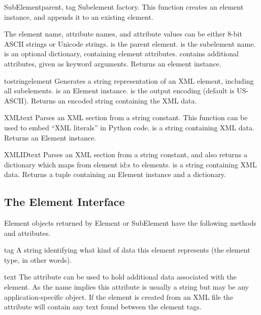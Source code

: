 \begin{funcdesc}{SubElement}{parent, tag}
Subelement factory.  This function creates an element instance, and
appends it to an existing element.

The element name, attribute names, and attribute values can be
either 8-bit ASCII strings or Unicode strings.
 is the parent element.
 is the subelement name.
 is an optional dictionary, containing element attributes.
 contains additional attributes, given as keyword arguments.
Returns an element instance.
\end{funcdesc}

\begin{funcdesc}{tostring}{element}
Generates a string representation of an XML element, including all
subelements.
 is an Element instance.
 is the output encoding (default is US-ASCII).
Returns an encoded string containing the XML data.
\end{funcdesc}

\begin{funcdesc}{XML}{text}
Parses an XML section from a string constant.  This function can
be used to embed ``XML literals'' in Python code.
 is a string containing XML data.
Returns an Element instance.
\end{funcdesc}

\begin{funcdesc}{XMLID}{text}
Parses an XML section from a string constant, and also returns
a dictionary which maps from element id:s to elements.
 is a string containing XML data.
Returns a tuple containing an Element instance and a dictionary.
\end{funcdesc}


\subsection{The Element Interface\label{elementtree-element-interface}}

Element objects returned by Element or SubElement have the 
following methods and attributes.

\begin{memberdesc}{tag}
A string identifying what kind of data this element represents
(the element type, in other words).
\end{memberdesc}

\begin{memberdesc}{text}
The  attribute can be used to hold additional data
associated with the element.
As the name implies this attribute is usually a string but may be any
application-specific object.
If the element is created from an XML file the attribute will contain
any text found between the element tags.
\end{memberdesc}

